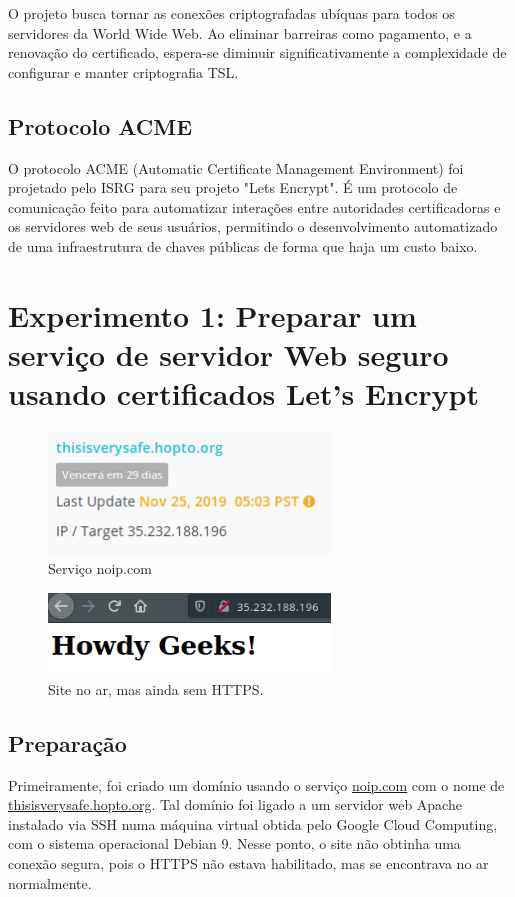 \documentclass{article}
\begin{document}
O projeto busca tornar as conexões criptografadas ubíquas para todos os servidores da World Wide Web. Ao eliminar barreiras como pagamento, e a renovação do certificado, espera-se diminuir significativamente a complexidade de configurar e manter criptografia TSL.
\subsection{Protocolo ACME}
O protocolo ACME (Automatic Certificate Management Environment) foi projetado pelo ISRG para seu projeto "Lets Encrypt". É um protocolo de comunicação feito para automatizar interações entre autoridades certificadoras e os servidores web de seus usuários, permitindo o desenvolvimento automatizado de uma infraestrutura de chaves públicas de forma que haja um custo baixo. 

\section{Experimento 1: Preparar um serviço de servidor Web seguro usando certificados Let's Encrypt}
\begin{figure}[h]
\centering
\includegraphics[width=7.5cm]{imagem2.png}
\caption{Serviço noip.com}
\end{figure}

\begin{figure}[h]
\centering
\includegraphics[width=7.5cm]{imagem3.png}
\caption{Site no ar, mas ainda sem HTTPS.}
\end{figure}

\subsection{Preparação}
Primeiramente, foi criado um domínio usando o serviço \url{noip.com} com o nome de \url{thisisverysafe.hopto.org}. Tal domínio foi ligado a um servidor web Apache instalado via SSH numa máquina virtual obtida pelo Google Cloud Computing, com o sistema operacional Debian 9. Nesse ponto, o site não obtinha uma conexão segura, pois o HTTPS não estava habilitado, mas se encontrava no ar normalmente.
\end{document}

